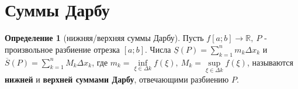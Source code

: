 \documentclass{report}
\theoremstyle{definition}
\newtheorem*{definition}{Определение}
\begin{document}
\section{Суммы Дарбу}

\begin{definition}[нижняя/верхняя суммы Дарбу]
    Пусть $f[a;b] \rightarrow \mathbb{R}, \ P$ - произвольное разбиение отрезка $[a;b]$. Числа
    $\underline{S}(P) = \sum_{k=1}^{n}m_{k}\Delta x_{k}$ и $\overline{S}(P) = \sum_{k=1}^{n}M_{k}
        \Delta x_{k}$, где $m_{k} = \underset{\xi \in \Delta k}{\inf}f(\xi), \ M_{k} = \underset{\xi\in\Delta k}
        {\sup}f(\xi)$, называются \textbf{нижней} и \textbf{верхней суммами Дарбу}, отвечающими разбиению $P$.

    \begin{figure}[h]
        \begin{minipage}[h]{0.49\linewidth}
        \end{minipage}
        \hfill
        \begin{minipage}[h]{0.49\linewidth}
        \end{minipage}
    \end{figure}
\end{definition}
\end{document}

